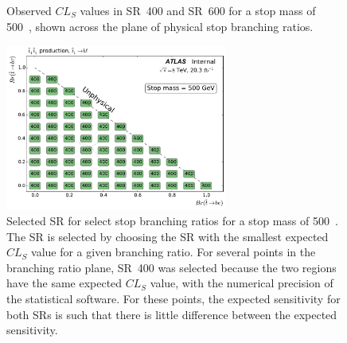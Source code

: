 \begin{figure}[ht]
  \centering
  \caption{
    Observed $CL_S$ values in SR~400 and SR~600 for a stop mass of 500~\GeV,
    shown across the plane of physical stop branching ratios.
  }
\end{figure}

\begin{figure}[ht]
  \centering
  \includegraphics[width=0.65\textwidth]
    {figs/blstop/region_selection/region_choice_vs_br_m_500.pdf}
  \caption{
    Selected SR for select stop branching ratios for a stop mass of 500~\GeV.
    The SR is selected by choosing the SR with the smallest expected $CL_S$
    value for a given branching ratio.
    For several points in the branching ratio plane, SR~400 was selected because
    the two regions have the same expected $CL_S$ value, with the numerical
    precision of the statistical software.
    For these points, the expected sensitivity for both SRs is such that
    there is little difference between the expected sensitivity.
  }
\end{figure}

